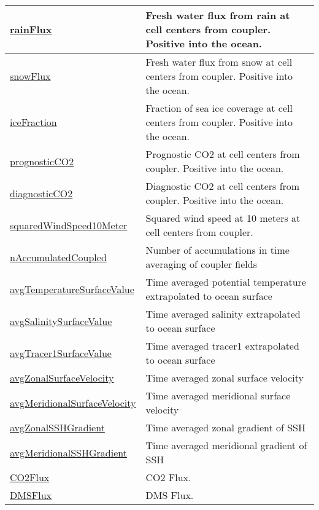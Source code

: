 {\begin{center}
\begin{longtable}{| p{2.0in} | p{4.0in} |}
	\hline
	\hyperref[subsec:var_sec_forcing_rainFlux]{rainFlux} & Fresh water flux from rain at cell centers from coupler. Positive into the ocean. \\
	\hline
	\hyperref[subsec:var_sec_forcing_snowFlux]{snowFlux} & Fresh water flux from snow at cell centers from coupler. Positive into the ocean. \\
	\hline
	\hyperref[subsec:var_sec_forcing_iceFraction]{iceFraction} & Fraction of sea ice coverage at cell centers from coupler. Positive into the ocean. \\
	\hline
	\hyperref[subsec:var_sec_forcing_prognosticCO2]{prognosticCO2} & Prognostic CO2 at cell centers from coupler. Positive into the ocean. \\
	\hline
	\hyperref[subsec:var_sec_forcing_diagnosticCO2]{diagnosticCO2} & Diagnostic CO2 at cell centers from coupler. Positive into the ocean. \\
	\hline
	\hyperref[subsec:var_sec_forcing_squaredWindSpeed10Meter]{squaredWindSpeed10Meter} & Squared wind speed at 10 meters at cell centers from coupler. \\
	\hline
	\hyperref[subsec:var_sec_forcing_nAccumulatedCoupled]{nAccumulatedCoupled} & Number of accumulations in time averaging of coupler fields \\
	\hline
	\hyperref[subsec:var_sec_forcing_avgTemperatureSurfaceValue]{avgTemperatureSurfaceValue} & Time averaged potential temperature extrapolated to ocean surface \\
	\hline
	\hyperref[subsec:var_sec_forcing_avgSalinitySurfaceValue]{avgSalinitySurfaceValue} & Time averaged salinity extrapolated to ocean surface \\
	\hline
	\hyperref[subsec:var_sec_forcing_avgTracer1SurfaceValue]{avgTracer1SurfaceValue} & Time averaged tracer1 extrapolated to ocean surface \\
	\hline
	\hyperref[subsec:var_sec_forcing_avgZonalSurfaceVelocity]{avgZonalSurfaceVelocity} & Time averaged zonal surface velocity \\
	\hline
	\hyperref[subsec:var_sec_forcing_avgMeridionalSurfaceVelocity]{avgMeridionalSurfaceVelocity} & Time averaged meridional surface velocity \\
	\hline
	\hyperref[subsec:var_sec_forcing_avgZonalSSHGradient]{avgZonalSSHGradient} & Time averaged zonal gradient of SSH \\
	\hline
	\hyperref[subsec:var_sec_forcing_avgMeridionalSSHGradient]{avgMeridionalSSHGradient} & Time averaged meridional gradient of SSH \\
	\hline
	\hyperref[subsec:var_sec_forcing_CO2Flux]{CO2Flux} & CO2 Flux. \\
	\hline
	\hyperref[subsec:var_sec_forcing_DMSFlux]{DMSFlux} & DMS Flux. \\
	\hline
\end{longtable}
\end{center}
}
